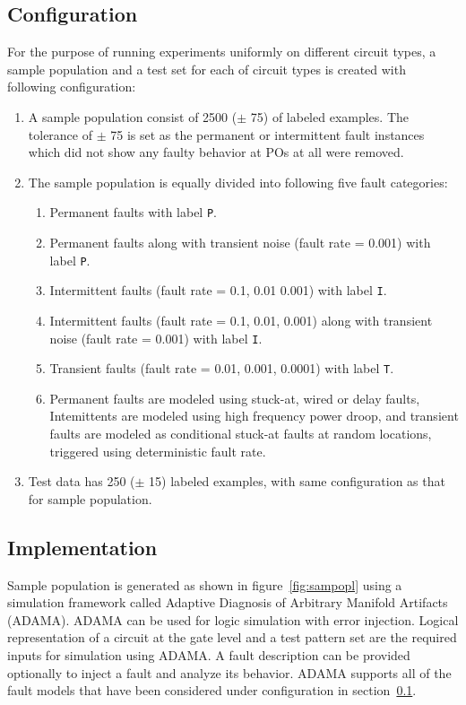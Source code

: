 \subsection{Configuration}
\label{sec:gsp:configuration}
For the purpose of running experiments uniformly on different circuit types, a sample population and a test set for each of circuit types is created with following configuration:
\begin{enumerate}
  \item A sample population consist of 2500 ($\pm$ 75) of labeled examples. The tolerance of $\pm$ 75 is set as the permanent or intermittent fault instances which did not show any faulty behavior at POs at all were removed.
  \item The sample population is equally divided into following five fault categories:
		\begin{enumerate}
    		\item Permanent faults with label \texttt{P}.
    		\item Permanent faults along with transient noise (fault rate = 0.001) with label \texttt{P}.
			\item Intermittent faults (fault rate = 0.1, 0.01 0.001) with label \texttt{I}.
    		\item Intermittent faults (fault rate = 0.1, 0.01, 0.001) along with transient noise (fault rate = 0.001) with label \texttt{I}.
			\item Transient faults (fault rate = 0.01, 0.001, 0.0001) with label \texttt{T}.
		\item Permanent faults are modeled using stuck-at, wired or delay faults, Intemittents are modeled using high frequency power droop, and transient faults are modeled as conditional stuck-at faults at random locations, triggered using deterministic fault rate.
 		 \end{enumerate}
  \item Test data has 250 ($\pm$ 15) labeled examples, with same configuration as that for sample population.
\end{enumerate}

\subsection{Implementation}

Sample population is generated as shown in figure~\ref{fig:sampopl} using a simulation framework called Adaptive Diagnosis of Arbitrary Manifold Artifacts (ADAMA). ADAMA can be used for logic simulation with error injection. Logical representation of a circuit at the gate level and a test pattern set are the required inputs for simulation using ADAMA. A fault description can be provided optionally to inject a fault and analyze its behavior. ADAMA supports all of the fault models that have been considered under configuration in section~\ref{sec:gsp:configuration}.

